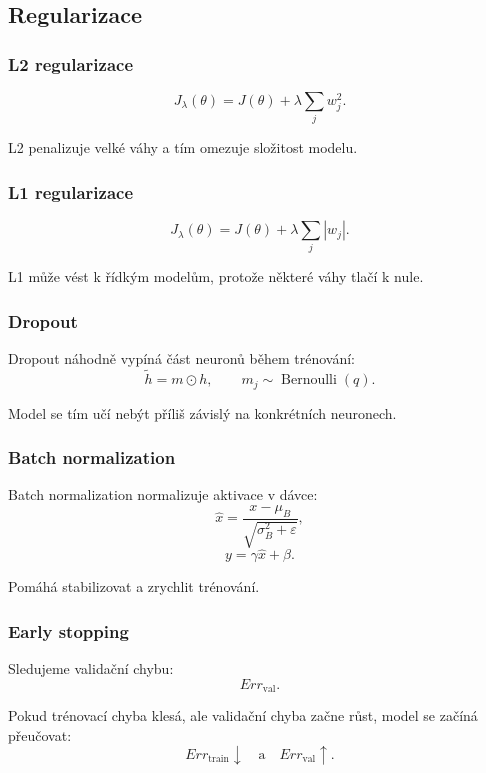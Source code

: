 \subsection{Regularizace}

\subsubsection{L2 regularizace}

\[
J_{\lambda}(\theta)
=
J(\theta)
+
\lambda
\sum_j w_j^2.
\]

L2 penalizuje velké váhy a tím omezuje složitost modelu.

\subsubsection{L1 regularizace}

\[
J_{\lambda}(\theta)
=
J(\theta)
+
\lambda
\sum_j |w_j|.
\]

L1 může vést k řídkým modelům, protože některé váhy tlačí k nule.

\subsubsection{Dropout}

Dropout náhodně vypíná část neuronů během trénování:
\[
\tilde h = m \odot h,
\qquad
m_j \sim \operatorname{Bernoulli}(q).
\]

Model se tím učí nebýt příliš závislý na konkrétních neuronech.

\subsubsection{Batch normalization}

Batch normalization normalizuje aktivace v dávce:
\[
\hat x =
\frac{x-\mu_B}
{\sqrt{\sigma_B^2+\varepsilon}},
\]
\[
y=\gamma \hat x+\beta.
\]

Pomáhá stabilizovat a zrychlit trénování.

\subsubsection{Early stopping}

Sledujeme validační chybu:
\[
Err_{\text{val}}.
\]

Pokud trénovací chyba klesá, ale validační chyba začne růst, model se začíná přeučovat:
\[
Err_{\text{train}}\downarrow
\quad
\text{a}
\quad
Err_{\text{val}}\uparrow.
\]


